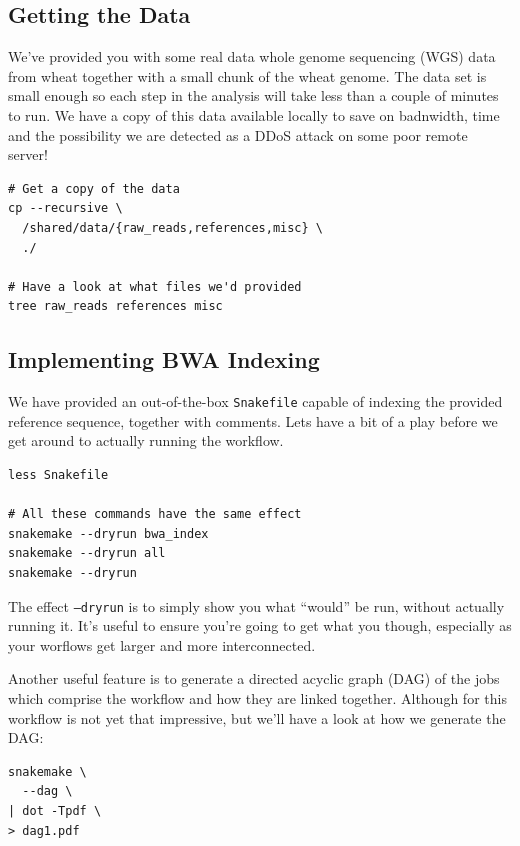 \subsection{Getting the Data}

We've provided you with some real data whole genome sequencing (WGS) data from wheat together with a small chunk of the wheat genome.
The data set is small enough so each step in the analysis will take less than a couple of minutes to run. We have a copy of this data
available locally to save on badnwidth, time and the possibility we are detected as a DDoS attack on some poor remote server!

\begin{lstlisting}
# Get a copy of the data
cp --recursive \
  /shared/data/{raw_reads,references,misc} \
  ./

# Have a look at what files we'd provided
tree raw_reads references misc
\end{lstlisting}

\subsection{Implementing BWA Indexing}

We have provided an out-of-the-box \texttt{Snakefile} capable of indexing the provided reference sequence, together with comments. Lets
have a bit of a play before we get around to actually running the workflow.

\begin{lstlisting}
less Snakefile

# All these commands have the same effect
snakemake --dryrun bwa_index
snakemake --dryrun all
snakemake --dryrun
\end{lstlisting}


The effect \texttt{--dryrun} is to simply show you what ``would'' be run, without actually running it. It's useful to ensure you're going to get
what you though, especially as your worflows get larger and more interconnected.

Another useful feature is to generate a directed acyclic graph (DAG) of the jobs which comprise the workflow and how they are linked together. Although
for this workflow is not yet that impressive, but we'll have a look at how we generate the DAG:

\begin{lstlisting}
snakemake \
  --dag \
| dot -Tpdf \
> dag1.pdf
\end{lstlisting}

